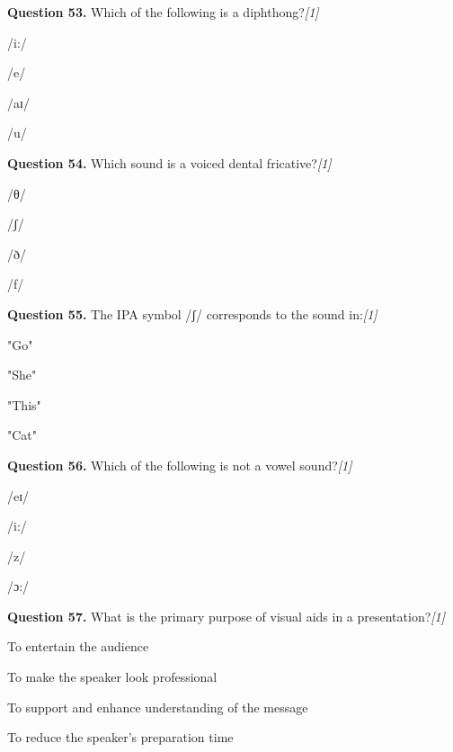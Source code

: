 \documentclass[11pt,a4paper]{article}
\newcommand{\pts}[1]{\hfill   \textit{[#1]}}
\begin{document}
\medskip


\noindent   \textbf{Question 53.} Which of the following is a diphthong?\pts{1}

\begin{parts}
  \item /i:/
  \item /e/
  \item /aɪ/
  \item /u/
\end{parts}

\medskip


\noindent   \textbf{Question 54.} Which sound is a voiced dental fricative?\pts{1}

\begin{parts}
  \item /θ/
  \item /ʃ/
  \item /ð/
  \item /f/
\end{parts}

\medskip


\noindent   \textbf{Question 55.} The IPA symbol /ʃ/ corresponds to the sound in:\pts{1}

\begin{parts}
  \item "Go"
  \item "She"
  \item "This"
  \item "Cat"
\end{parts}

\medskip


\noindent   \textbf{Question 56.} Which of the following is not a vowel sound?\pts{1}

\begin{parts}
  \item /eɪ/
  \item /i:/
  \item /z/
  \item /ɔ:/
\end{parts}

\medskip


\noindent   \textbf{Question 57.} What is the primary purpose of visual aids in a presentation?\pts{1}

\begin{parts}
  \item To entertain the audience
  \item To make the speaker look professional
  \item To support and enhance understanding of the message
  \item To reduce the speaker's preparation time
\end{parts}
\end{document}
